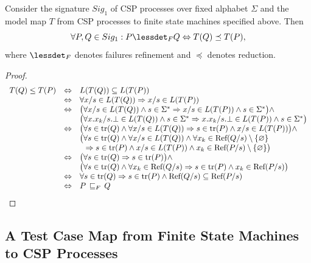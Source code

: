 \begin{theorem}
\label{th:sc1}
Consider the signature $Sig_1$ of CSP processes over fixed alphabet $\Sigma$ and the 
model map $T$ from CSP processes to finite state machines specified above.
Then
$$
\forall P, Q\in Sig_1: P \lessdet_F Q \Leftrightarrow   T(Q) \preceq T(P),
$$
where $\lessdet_F$ denotes failures refinement and $\preceq$ denotes reduction.
\end{theorem}
\begin{proof}
\[\begin{array}{lll}
T(Q)\le T(P) &\Leftrightarrow & L(T(Q))\subseteq L(T(P))\\
&\Leftrightarrow & \forall x/s\in L(T(Q))\Rightarrow x/s\in  L(T(P))\\
&\Leftrightarrow & \big(\forall x/s\in L(T(Q))\wedge s\in \Sigma^*\Rightarrow x/s\in  L(T(P))\wedge s\in \Sigma^* \big)\wedge\\
& &  \big(\forall x.x_k/s.\bot\in L(T(Q))\wedge s\in\Sigma^*\Rightarrow x.x_k/s.\bot\in  L(T(P))\wedge s\in\Sigma^*\big) \\
&\Leftrightarrow & \big(\forall s\in {\text {\rm tr}}(Q) \wedge \forall x/s\in L(T(Q))
 \Rightarrow  s\in {\text {\rm tr}}(P) \wedge   x/s\in L(T(P))\big)\wedge \\
& & \big(\forall s\in {\text {\rm tr}}(Q) \wedge\forall x/s\in L(T(Q))\wedge \forall x_k\in {\text {\rm Ref}}(Q/s)\setminus\{\varnothing\}\\&&{\phantom{\big(}}\Rightarrow  s\in {\text {\rm tr}}(P)\wedge  x/s\in L(T(P))\wedge  x_k\in {\text {\rm Ref}}(P/s)\setminus\{\varnothing\}\big) \\

&\Leftrightarrow & \big(\forall s\in {\text {\rm tr}}(Q) \Rightarrow  s\in {\text {\rm tr}}(P) \big) \wedge \\
& & \big(\forall s\in {\text {\rm tr}}(Q) \wedge \forall x_k\in {\text {\rm Ref}}(Q/s)\Rightarrow  s\in {\text {\rm tr}}(P) \wedge  x_k\in {\text {\rm Ref}}(P/s)\big) \\
&\Leftrightarrow &  \forall s\in {\text {\rm tr}}(Q)\Rightarrow s\in{\text {\rm tr}}(P) \wedge {\text {\rm Ref}}(Q/s)\subseteq {\text {\rm Ref}}(P/s)\\
&\Leftrightarrow & P\,\sqsubseteq_F\, Q

\end{array}
\]
\end{proof}
 

\subsection{A Test Case Map from Finite State Machines to CSP Processes}
\label{sec:tcmap}

